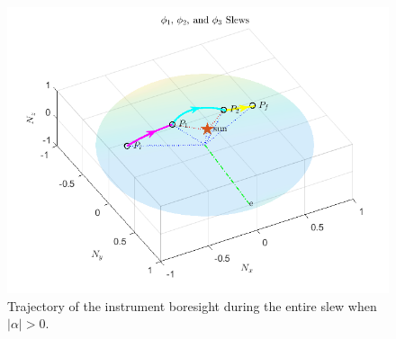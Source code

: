 \documentclass[letterpaper, paper,12pt]{AAS}		%
\begin{document}
	\begin{figure}[!ht]
	\begin{center}
		\includegraphics[width=4.75in]{figures/alphaNot0/phi1_phi2_phi3.png}
		\caption{Trajectory of the instrument boresight during the entire slew when $|\alpha|>0$.}
		\label{fig:phi1_phi2_phi3}
	\end{center}		
\end{figure}	
\end{document}
